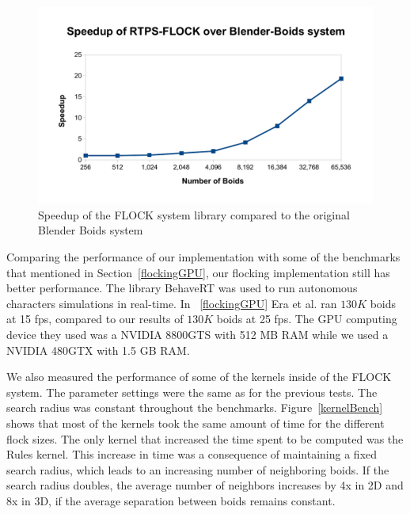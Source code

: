 \begin{figure}[htbp]
\begin{center}
\includegraphics[scale=0.7]{figures/speedup.pdf}
\caption{Speedup of the FLOCK system library compared to the original Blender Boids system}
\label{speedup}
\end{center}
\end{figure}

Comparing the performance of our implementation with some of the benchmarks that mentioned in Section~\ref{flockingGPU}, our flocking implementation still has better performance. The library BehaveRT was used to run autonomous characters simulations in real-time.
In ~\ref{flockingGPU} Era et al. ran $130K$ boids at 15 fps, compared to our results of $130K$ boids at 25 fps. The GPU computing device they used was a NVIDIA 8800GTS with 512 MB RAM while we used a NVIDIA 480GTX with 1.5 GB RAM. 

We also measured the performance of some of the kernels inside of the FLOCK system. 
The parameter settings were the same as for the previous tests. 
The search radius was constant throughout the benchmarks. 
Figure~\ref{kernelBench} shows that most of the kernels took the same amount of time for the different flock sizes. The only kernel that increased the time spent to be computed was the Rules kernel. This increase in time was a consequence of maintaining a fixed search radius, which leads to an increasing number of neighboring boids. If the search radius doubles, the average number of neighbors
increases by 4x in 2D and 8x in 3D, if the average separation between boids 
remains constant. 

